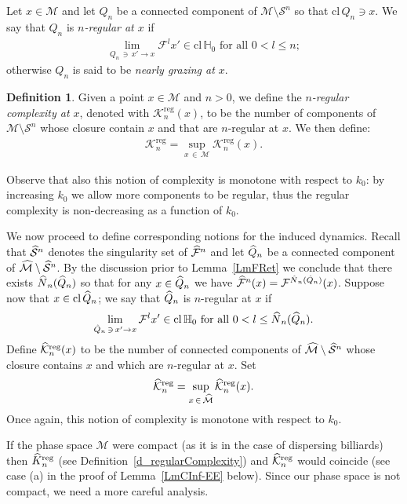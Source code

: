 \documentclass[10pt]{amsart}
\theoremstyle{definition}\newtheorem{defi}[theo]{Definition}\newtheorem{rema}[theo]{Remark}\newtheorem{exam}[theo]{Example}\newtheorem{exem}[theo]{Example}\newtheorem{nota}[theo]{Notation}
\newcommand{\cl}[1]{\mathrm{cl}\,#1}
\newcommand{\homo}{\mathbb{H}}
\newcommand{\cm}{\mathcal{F}}
\newcommand{\csp}{\mathcal{M}}
\newcommand{\cmp}{\hat\cm}
\newcommand{\cspi}{\widehat{\csp}}
\newcommand{\singPrivate}{\mathcal{S}}
\newcommand{\sing}[1]{\singPrivate^{#1}}
\newcommand{\singp}[1]{\hat{\singPrivate}^{#1}}
\newcommand{\cc}{\hat Q}
\newcommand{\ckreg}{\mathcal{K}^\text{reg}}
\newcommand{\ckregp}{\hat{\mathcal{K}}^\text{reg}}
\newcommand{\hkreg}{\hat{K}^\text{reg}}
\newcommand{\kregp}{\hkreg}
\newcommand{\Np}{\hat N}
\let\oldhat\hat
\renewcommand*{\hat}[1]{\mathchoice{\widehat{#1}}{\widehat{#1}}{\oldhat{#1}}{\oldhat{#1}}}
\begin{document}
Let $x\in\csp$ and let $Q_n$ be a connected component of $\csp\setminus\sing n$ so that $\cl Q_n\ni x$. We say that $Q_n$ is
\emph{$n$-regular at $x$} if
\begin{align*}
\lim_{Q_n\,\ni\,x'\to x}\cm^{l}x'\in \cl\homo_0\text{ for all $0 < l\le n$};
\end{align*}
otherwise $Q_n$ is said to be \emph{nearly grazing at $x$}.

\begin{defi}\label{d_regular pointwise complexity}
Given a point $x\in\csp$ and $n > 0$, we define the \emph{$n$-regular complexity at $x$}, denoted with $\ckreg_n(x)$, to be the number of components of $\csp\setminus\sing n$ whose closure contain $x$ and that are $n$-regular at $x$. We then define:
\begin{align*}
\ckreg_n = \sup_{x\,\in\,\csp}\ckreg_n(x).
\end{align*}
\end{defi}

Observe that also this notion of complexity is monotone with respect to $k_{0}$: by increasing $k_{0}$ we allow more components to be regular, thus the regular complexity is non-decreasing as a function of $k_{0}$.

We now proceed to define corresponding notions for the induced dynamics. Recall that $\singp{n}$ denotes the singularity set of $\cmp^{n}$ and let $\hat Q_n$ be a connected component of $\cspi\setminus\singp{n}$. By the discussion prior to Lemma~\ref{LmFRet} we conclude that there exists $\Np_n(\cc_n)$ so that for any $x\in\hat Q_n$ we have $\cmp^n(x) = \cm^{\Np_n(\cc_n)}(x)$. Suppose now that $x\in\cl\hat Q_n$; we say that $\hat Q_n$ is $n$-regular at $x$ if
\begin{align*}
\lim_{\hat Q_n\,\ni\,x'\to x}\cm^{l}x'\in \cl\homo_0\text{ for all }0 < l\le \Np_n(\cc_n).
\end{align*}
Define $\ckregp_n(x)$ to be the number of connected components of $\cspi\setminus\singp{n}$ whose closure contains $x$ and which are $n$-regular at $x$. Set
\begin{align}\label{e_defInducedRegularComplexity}
\ckregp_n = \sup_{x\,\in\,\cspi}\ckregp_n(x).
\end{align}
Once again, this notion of complexity is monotone with respect to $k_{0}$.


If the phase space $\csp$ were compact (as it is in the case of dispersing billiards) then $\kregp_n$ (see Definition~\ref{d_regularComplexity}) and $\ckregp_n$ would coincide (see case (a) in the proof of Lemma~\ref{LmCInf-EE} below). Since our phase space is not compact, we need a more careful analysis.
\end{document}
